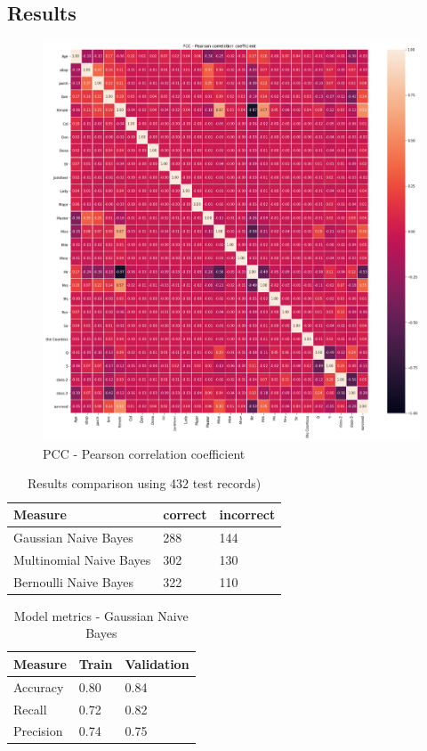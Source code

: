 \documentclass{article}
\begin{document}
\subsection{Results}
\begin{figure}[H]
	\includegraphics[width=\textwidth,height=\textheight,keepaspectratio]{heat_map.png}
	\caption{PCC - Pearson correlation coefficient}
	\label{fig:PCC}
\end{figure}

\begin{table}[H]
	\centering
	\caption{Results comparison using 432 test records)}
	\label{tab:result-comparison}
	\begin{tabular}{|l|l|l|}
		\hline
		\textbf{Measure} & \textbf{correct} & \textbf{incorrect} \\ \hline
		Gaussian Naive Bayes       	 & 288    & 144 \\ \hline
		Multinomial Naive Bayes      & 302    & 130 \\ \hline
		Bernoulli Naive Bayes    	 & 322    & 110 \\ \hline
	\end{tabular}
\end{table}

\begin{table}[H]
	\centering
	\caption{Model metrics - Gaussian Naive Bayes}
	\label{tab:Gaussian-metrics}
	\begin{tabular}{|l|l|l|}
		\hline
		\textbf{Measure} & \textbf{Train} & \textbf{Validation} \\ \hline
		Accuracy       	 & 0.80    & 0.84 \\ \hline
		Recall    		 & 0.72    & 0.82 \\ \hline
		Precision    	 & 0.74    & 0.75 \\ \hline
	\end{tabular}
\end{table}
\end{document}
